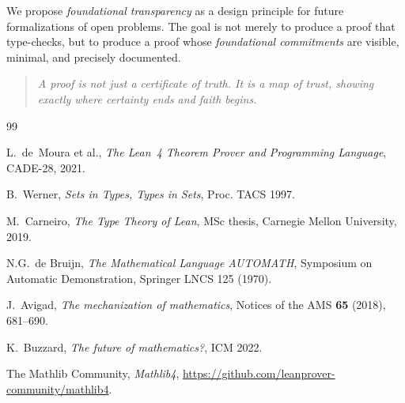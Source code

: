 \documentclass[11pt,a4paper]{article}
\begin{document}
We propose \emph{foundational transparency} as a design principle
for future formalizations of open problems. The goal is not merely
to produce a proof that type-checks, but to produce a proof whose
\emph{foundational commitments} are visible, minimal, and precisely
documented.

\begin{quote}
\emph{A proof is not just a certificate of truth. It is a map of
trust, showing exactly where certainty ends and faith begins.}
\end{quote}

\vspace{1cm}

\begin{thebibliography}{99}

L.~de~Moura et al., \emph{The Lean~4 Theorem Prover and Programming
Language}, CADE-28, 2021.

B.~Werner, \emph{Sets in Types, Types in Sets}, Proc. TACS 1997.

M.~Carneiro, \emph{The Type Theory of Lean}, MSc thesis,
Carnegie Mellon University, 2019.

N.G.~de Bruijn, \emph{The Mathematical Language AUTOMATH},
Symposium on Automatic Demonstration, Springer LNCS 125 (1970).

J.~Avigad, \emph{The mechanization of mathematics}, Notices of the
AMS \textbf{65} (2018), 681--690.

K.~Buzzard, \emph{The future of mathematics?}, ICM 2022.

The Mathlib Community, \emph{Mathlib4},
\url{https://github.com/leanprover-community/mathlib4}.

\end{thebibliography}
\end{document}
